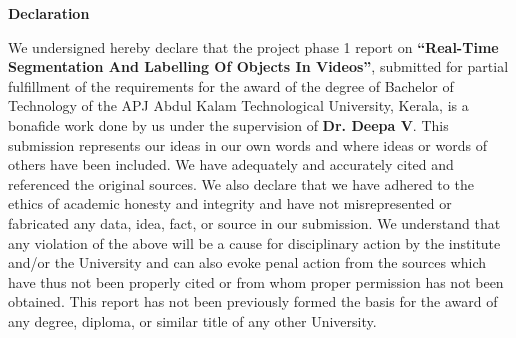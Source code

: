 \begin{center}
  \vspace*{1cm}
  \textbf{\large Declaration}
\end{center}
We undersigned hereby declare that the project phase 1 report on {\bf“Real-Time Segmentation And Labelling Of Objects In Videos”}, submitted for partial fulfillment of the requirements for the award of the degree of Bachelor of Technology of the APJ Abdul Kalam Technological University, Kerala, is a bonafide work done by us under the supervision of {\bf Dr. Deepa V}. This submission represents our ideas in our own words and where ideas or words of others have been included. We have adequately and accurately cited and referenced the original sources. We also declare that we have adhered to the ethics of academic honesty and integrity and have not misrepresented or fabricated any data, idea, fact, or source in our submission. We understand that any violation of the above will be a cause for disciplinary action by the institute and/or the University and can also evoke penal action from the sources which have thus not been properly cited or from whom proper permission has not been obtained. This report has not been previously formed the basis for the award of any degree, diploma, or similar title of any other University. 
\vspace{1.3 cm} \\

